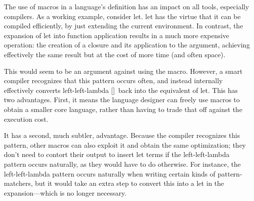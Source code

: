 
The use of macros in a language’s definition has an impact on all tools,
especially compilers. As a working example, consider let. let has the virtue
that it can be compiled efficiently, by just extending the current environment.
In contrast, the expansion of let into function application results in a much
more expensive operation: the creation of a closure and its application to the
argument, achieving effectively the same result but at the cost of more time
(and often space).

This would seem to be an argument against using the macro. However, a smart
compiler recognizes that this pattern occurs often, and instead internally
effectively converts left-left-lambda \ref{}\ back into the equivalent of let.
This has two advantages. First, it means the language designer can freely use
macros to obtain a smaller core language, rather than having to trade that off
against the execution cost.

It has a second, much subtler, advantage. Because the compiler recognizes this
pattern, other macros can also exploit it and obtain the same optimization; they
don’t need to contort their output to insert let terms if the left-left-lambda
pattern occurs naturally, as they would have to do otherwise. For instance, the
left-left-lambda pattern occurs naturally when writing certain kinds of
pattern-matchers, but it would take an extra step to convert this into a let in
the expansion—which is no longer necessary.
